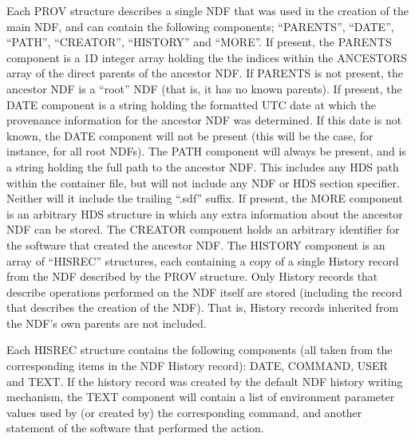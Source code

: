\documentclass[twoside,11pt]{article}
\renewcommand{\_}{\texttt{\symbol{95}}}
\begin{document}
Each PROV structure describes a single NDF that was used in the creation
of the main NDF, and can contain the following components; ``PARENTS'',
``DATE'', ``PATH'', ``CREATOR'', ``HISTORY'' and ``MORE''. If present, the PARENTS
component is a 1D integer array holding the the indices within the
ANCESTORS array of the direct parents of the ancestor NDF. If PARENTS is
not present, the ancestor NDF is a ``root'' NDF (that is, it has no known
parents). If present, the DATE component is a string holding the
formatted UTC date at which the provenance information for the ancestor
NDF was determined. If this date is not known, the DATE component will
not be present (this will be the case, for instance, for all root NDFs).
The PATH component will always be present, and is a string holding the
full path to the ancestor NDF. This includes any HDS path within the
container file, but will not include any NDF or HDS section specifier.
Neither will it include the trailing ``.sdf'' suffix. If present, the MORE
component is an arbitrary HDS structure in which any extra information
about the ancestor NDF can be stored. The CREATOR component holds an
arbitrary identifier for the software that created the ancestor NDF. The
HISTORY component is an array of ``HISREC'' structures, each containing a
copy of a single History record from the NDF described by the PROV
structure. Only History records that describe operations performed on the
NDF itself are stored (including the record that describes the creation
of the NDF). That is, History records inherited from the NDF's own
parents are not included.

Each HISREC structure contains the following components (all taken from
the corresponding items in the NDF History record): DATE, COMMAND, USER
and TEXT. If the history record was created by the default NDF history
writing mechanism, the TEXT component will contain a list of environment
parameter values used by (or created by) the corresponding command, and
another statement of the software that performed the action.

\newpage
\end{document}
